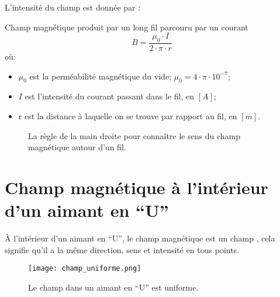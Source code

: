 L'intensité du champ est donnée par :
\begin{encadre_equation*}{Champ magnétique produit par un long fil parcouru par un courant}
    \begin{equation}
        B=\frac{\mu_0 \cdot I}{2 \cdot \pi \cdot r}
    \end{equation} où:
    \begin{itemize}[label=\textbullet]
        \item \(\mu_0\) est la perméabilité magnétique du vide; \(\mu_0=4 \cdot \pi \cdot 10^{-7}\);
        \item \(I\) est l'intensité du courant passant dans le fil, en \([A]\);
        \item r est la distance à laquelle on se trouve par rapport au fil, en \([m]\).
    \end{itemize}
\end{encadre_equation*}


\begin{figure}[h!]
    \centering
    \resizebox{.5\linewidth}{!}
    {}
    \caption{La règle de la main droite pour connaître le sens du champ magnétique autour d'un fil.}
    \label{regle_main_droite_oersted}
\end{figure}



\newpage

\section{Champ magnétique à l'intérieur d'un aimant en \enquote{U}}
À l'intérieur d'un aimant en \enquote{U}, le champ magnétique est un champ , cela signifie qu'il a la même direction, sens et intensité en tous points.

\begin{figure}[h]
    \centering
    \texttt{[image: champ\_uniforme.png]}
    \caption{Le champ dans un aimant en \enquote{U} est uniforme.}
    \label{champ_uniforme}
\end{figure}

\newpage

